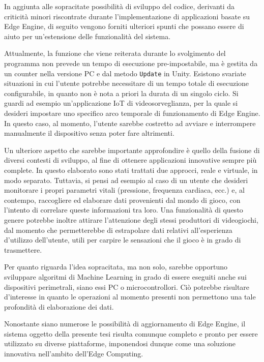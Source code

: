 In aggiunta alle sopracitate possibilità di sviluppo del codice, derivanti da criticità minori riscontrate durante l’implementazione di applicazioni basate su Edge Engine, di seguito vengono forniti ulteriori spunti che possano essere di aiuto per un’estensione delle funzionalità del sistema.

Attualmente, la funzione che viene reiterata durante lo svolgimento del programma non prevede un tempo di esecuzione pre-impostabile, ma è gestita da un counter nella versione PC e dal metodo \texttt{Update} in Unity. Esistono svariate situazioni in cui l’utente potrebbe necessitare di un tempo totale di esecuzione configurabile, in quanto non è nota a priori la durata di un singolo ciclo. Si guardi ad esempio un’applicazione IoT di videosorveglianza, per la quale si desideri impostare uno specifico arco temporale di funzionamento di Edge Engine. In questo caso, al momento, l’utente sarebbe costretto ad avviare e interrompere manualmente il dispositivo senza poter fare altrimenti.

Un ulteriore aspetto che sarebbe importante approfondire è quello della fusione di diversi contesti di sviluppo, al fine di ottenere applicazioni innovative sempre più complete. In questo elaborato sono stati trattati due approcci, reale e virtuale, in modo separato. Tuttavia, si pensi ad esempio al caso di un utente che desideri monitorare i propri parametri vitali (pressione, frequenza cardiaca, ecc.) e, al contempo, raccogliere ed elaborare dati provenienti dal mondo di gioco, con l’intento di correlare queste informazioni tra loro. Una funzionalità di questo genere potrebbe inoltre attirare l’attenzione degli stessi produttori di videogiochi, dal momento che permetterebbe di estrapolare dati relativi all'esperienza d’utilizzo dell'utente, utili per carpire le sensazioni che il gioco è in grado di trasmettere.

Per quanto riguarda l’idea sopracitata, ma non solo, sarebbe opportuno sviluppare algoritmi di Machine Learning in grado di essere eseguiti anche sui dispositivi perimetrali, siano essi PC o microcontrollori. Ciò potrebbe risultare d’interesse in quanto le operazioni al momento presenti non permettono una tale profondità di elaborazione dei dati.

Nonostante siano numerose le possibilità di aggiornamento di Edge Engine, il sistema oggetto della presente tesi risulta comunque completo e pronto per essere utilizzato su diverse piattaforme, imponendosi dunque come una soluzione innovativa nell'ambito dell'Edge Computing.
